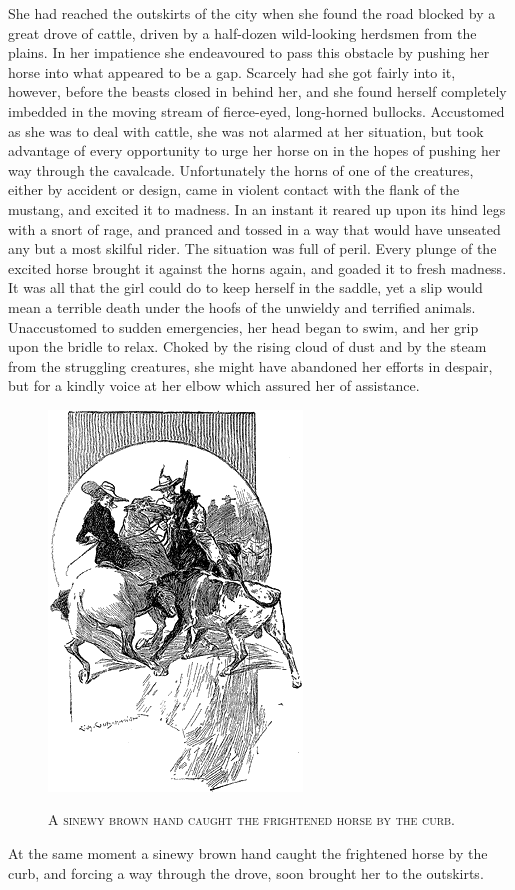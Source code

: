 \documentclass[12pt,english,oneside]{book}
\newcommand{\noun}[1]{\textsc{#1}}
\begin{document}
She had reached the outskirts of the city when she found the road
blocked by a great drove of cattle, driven by a half-dozen wild-looking
herdsmen from the plains. In her impatience she endeavoured to pass
this obstacle by pushing her horse into what appeared to be a gap.
Scarcely had she got fairly into it, however, before the beasts closed
in behind her, and she found herself completely imbedded in the moving
stream of fierce-eyed, long-horned bullocks. Accustomed as she was
to deal with cattle, she was not alarmed at her situation, but took
advantage of every opportunity to urge her horse on in the hopes of
pushing her way through the cavalcade. Unfortunately the horns of
one of the creatures, either by accident or design, came in violent
contact with the flank of the mustang, and excited it to madness.
In an instant it reared up upon its hind legs with a snort of rage,
and pranced and tossed in a way that would have unseated any but a
most skilful rider. The situation was full of peril. Every plunge
of the excited horse brought it against the horns again, and goaded
it to fresh madness. It was all that the girl could do to keep herself
in the saddle, yet a slip would mean a terrible death under the hoofs
of the unwieldy and terrified animals. Unaccustomed to sudden emergencies,
her head began to swim, and her grip upon the bridle to relax. Choked
by the rising cloud of dust and by the steam from the struggling creatures,
she might have abandoned her efforts in despair, but for a kindly
voice at her elbow which assured her of assistance. %
\begin{figure}[htbp]
\noindent \begin{center}\includegraphics{images/study10-stud-16.png}\end{center}

\noindent \begin{center}\noun{A sinewy brown hand caught the frightened
horse by the curb.}\end{center}
\end{figure}
At the same moment a sinewy brown hand caught the frightened horse
by the curb, and forcing a way through the drove, soon brought her
to the outskirts.
\end{document}
